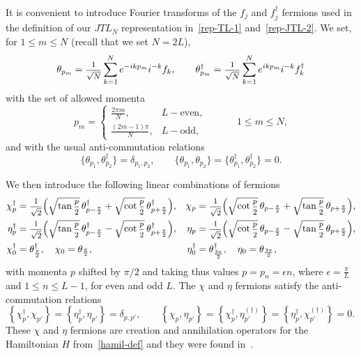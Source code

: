 \documentclass[11pt]{article}
\newcommand{\ffrac}[2]{\mbox{\footnotesize$\displaystyle\frac{#1}{#2}$}}
\newcommand{\JTL}[1]{JTL_{#1}}
\newcommand{\ferm}{\theta}
\newcommand{\fermd}{\theta^{\dagger}}
\newcommand{\step}{\epsilon}
\theoremstyle{definition}
\begin{document}
It is convenient to introduce Fourier transforms of the $f_j$ and
$f^{\dagger}_j$ fermions used in the definition of our $\JTL{N}$
representation in~\eqref{rep-TL-1} and~\eqref{rep-JTL-2}. We set, for $1\leq m\leq N$ (recall that we set $N=2L$),
\begin{equation}\label{def-ferm}
\ferm_{p_m} = \ffrac{1}{\sqrt{N}}\sum_{k=1}^N e^{-ikp_m}i^{-k}f_{k}, \qquad
\fermd_{p_m} = \ffrac{1}{\sqrt{N}}\sum_{k=1}^N e^{ikp_m}i^{-k}f^{\dagger}_{k}
\end{equation}
with the set of allowed momenta
\begin{equation}\label{momenta-set}
p_m=
\begin{cases}
\frac{2\pi m}{N},\qquad &L-\text{even},\\
\frac{(2m-1)\pi}{N}, &L-\text{odd},
\end{cases}
\qquad\quad 1\leq m\leq N,
\end{equation}
and with the usual anti-commutation relations
\begin{equation*}
\{\ferm_{p_1},\fermd_{p_2}\} = \delta_{p_1,p_2}, \qquad \{\ferm_{p_1},\ferm_{p_2}\} = \{\fermd_{p_1},\fermd_{p_2}\} = 0.
\end{equation*}

We then introduce the following linear combinations of fermions
\begin{align}
\chi^{\dagger}_p &=
\ffrac{1}{\sqrt{2}}\Bigl(\sqrt{\tan{\ffrac{p}{2}}}\,\fermd_{p-\frac{\pi}{2}} +
\sqrt{\cot{\ffrac{p}{2}}}\,\fermd_{p+\frac{\pi}{2}}\Bigr),&
\chi_p &=
\ffrac{1}{\sqrt{2}}\Bigl(\sqrt{\cot{\ffrac{p}{2}}}\,\ferm_{p-\frac{\pi}{2}} +
\sqrt{\tan{\ffrac{p}{2}}}\,\ferm_{p+\frac{\pi}{2}}\Bigr),\notag\\
\eta^{\dagger}_p &=
\ffrac{1}{\sqrt{2}}\Bigl(\sqrt{\tan{\ffrac{p}{2}}}\,\fermd_{p-\frac{\pi}{2}} -
\sqrt{\cot{\ffrac{p}{2}}}\,\fermd_{p+\frac{\pi}{2}}\Bigr),&
\eta_p &=
\ffrac{1}{\sqrt{2}}\Bigl(\sqrt{\cot{\ffrac{p}{2}}}\,\ferm_{p-\frac{\pi}{2}} -
\sqrt{\tan{\ffrac{p}{2}}}\,\ferm_{p+\frac{\pi}{2}}\Bigr),\label{eq:chi-eta-def}\\
\chi^{\dagger}_0 &= \fermd_{\frac{\pi}{2}},\quad \chi_0 = \ferm_{\frac{\pi}{2}},&
\eta^{\dagger}_0 &= \fermd_{\frac{3\pi}{2}},\quad \eta_0=\ferm_{\frac{3\pi}{2}},\notag
\end{align}
with momenta $p$ shifted by $\pi/2$ and taking thus values
$p=p_n=\step n$, where $\step=\frac{\pi}{L}$ and $1\leq n\leq L-1$, for even and odd $L$. The
$\chi$ and $\eta$ fermions  satisfy the anti-commutation relations
\begin{equation}\label{chi-eta-rels}
\left\{\chi^{\dagger}_p,\chi_{p'}\right\} = \left\{\eta^{\dagger}_p,\eta_{p'}\right\} =
\delta_{p,p'}, \qquad
\left\{\chi_p,\eta_{p'}\right\} =
\left\{\chi^{\dagger}_p,\eta^{(\dagger)}_{p'}\right\} =
\left\{\eta^{\dagger}_p,\chi^{(\dagger)}_{p'}\right\} = 0.
\end{equation}
These $\chi$ and $\eta$ fermions are creation and
annihilation operators for the Hamiltonian $H$ from~\eqref{hamil-def} and they were found in~\cite{GRS1}.
\end{document}
